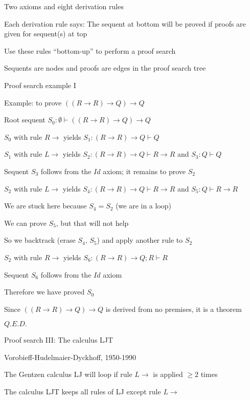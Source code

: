 Two axioms and eight derivation rules

Each derivation rule says: The sequent at bottom will be proved if
proofs are given for sequent(s) at top

Use these rules \textsf{``}bottom-up\textsf{''} to perform a proof search

Sequents are nodes and proofs are edges in the proof search tree

Proof search example I

Example: to prove $\left(\left(R\rightarrow R\right)\rightarrow Q\right)\rightarrow Q$

Root sequent $S_{0}:\emptyset\vdash\left(\left(R\rightarrow R\right)\rightarrow Q\right)\rightarrow Q$

$S_{0}$ with rule $R\rightarrow$ yields $S_{1}:\left(R\rightarrow R\right)\rightarrow Q\vdash Q$

$S_{1}$ with rule $L\rightarrow$ yields $S_{2}:\left(R\rightarrow R\right)\rightarrow Q\vdash R\rightarrow R$
and $S_{3}:Q\vdash Q$

Sequent $S_{3}$ follows from the $Id$ axiom; it remains to prove
$S_{2}$

$S_{2}$ with rule $L\rightarrow$ yields $S_{4}:\left(R\rightarrow R\right)\rightarrow Q\vdash R\rightarrow R$
and $S_{5}:Q\vdash R\rightarrow R$

We are stuck here because $S_{4}=S_{2}$ (we are in a loop)

We can prove $S_{5}$, but that will not help

So we backtrack (erase $S_{4}$, $S_{5}$) and apply another rule
to $S_{2}$

$S_{2}$ with rule $R\rightarrow$ yields $S_{6}:\left(R\rightarrow R\right)\rightarrow Q;R\vdash R$

Sequent $S_{6}$ follows from the $Id$ axiom

Therefore we have proved $S_{0}$

Since $\left(\left(R\rightarrow R\right)\rightarrow Q\right)\rightarrow Q$
is derived from no premises, it is a theorem

$Q.E.D.$

Proof search III: The calculus LJT

Vorobieff-Hudelmaier-Dyckhoff, 1950-1990

The Gentzen calculus LJ will loop if rule $L\rightarrow$ is applied
$\geq2$ times

The calculus LJT keeps all rules of LJ except rule $L\rightarrow$

